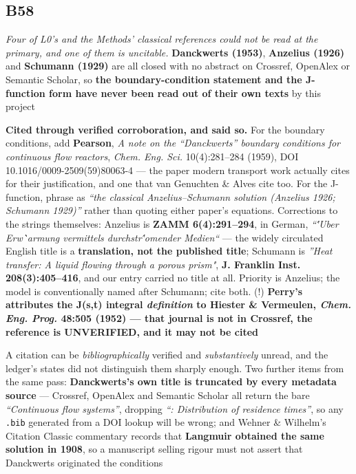 \documentclass[10pt]{article}
\begin{document}
\subsection*{B58}\label{led:B58}
\begin{description}[leftmargin=0pt,itemsep=1pt]
\item[Defect.] \emph{Four of L0's and the Methods' classical references could not be read at the primary, and one of them is uncitable.} \textbf{Danckwerts (1953)}, \textbf{Anzelius (1926)} and \textbf{Schumann (1929)} are all closed with no abstract on Crossref, OpenAlex or Semantic Scholar, so \textbf{the boundary-condition statement and the J-function form have never been read out of their own texts} by this project
\item[Resolution.] \textbf{Cited through verified corroboration, and said so.} For the boundary conditions, add \textbf{Pearson}, \emph{A note on the ``Danckwerts'' boundary conditions for continuous flow reactors}, \emph{Chem. Eng. Sci.} 10(4):281--284 (1959), DOI 10.1016/0009-2509(59)80063-4 --- the paper modern transport work actually cites for their justification, and one that van Genuchten \& Alves cite too. For the J-function, phrase as \emph{``the classical Anzelius--Schumann solution (Anzelius 1926; Schumann 1929)''} rather than quoting either paper's equations. Corrections to the strings themselves: Anzelius is \textbf{ZAMM 6(4):291--294}, in German, \emph{``\''Uber Erw\``armung vermittels durchstr\''omender Medien``} --- the widely circulated English title is a \textbf{translation, not the published title}; Schumann is \emph{''Heat transfer: A liquid flowing through a porous prism"}, \textbf{J. Franklin Inst. 208(3):405--416}, and our entry carried no title at all. Priority is Anzelius; the model is conventionally named after Schumann; cite both. (!) \textbf{Perry's attributes the J(s,t) integral \emph{definition} to Hiester \& Vermeulen, \emph{Chem. Eng. Prog.} 48:505 (1952) --- that journal is not in Crossref, the reference is UNVERIFIED, and it may not be cited}
\item[Note.] A citation can be \emph{bibliographically} verified and \emph{substantively} unread, and the ledger's states did not distinguish them sharply enough. Two further items from the same pass: \textbf{Danckwerts's own title is truncated by every metadata source} --- Crossref, OpenAlex and Semantic Scholar all return the bare \emph{``Continuous flow systems''}, dropping \emph{``: Distribution of residence times''}, so any \texttt{.bib} generated from a DOI lookup will be wrong; and Wehner \& Wilhelm's Citation Classic commentary records that \textbf{Langmuir obtained the same solution in 1908}, so a manuscript selling rigour must not assert that Danckwerts originated the conditions
\end{description}
\end{document}
